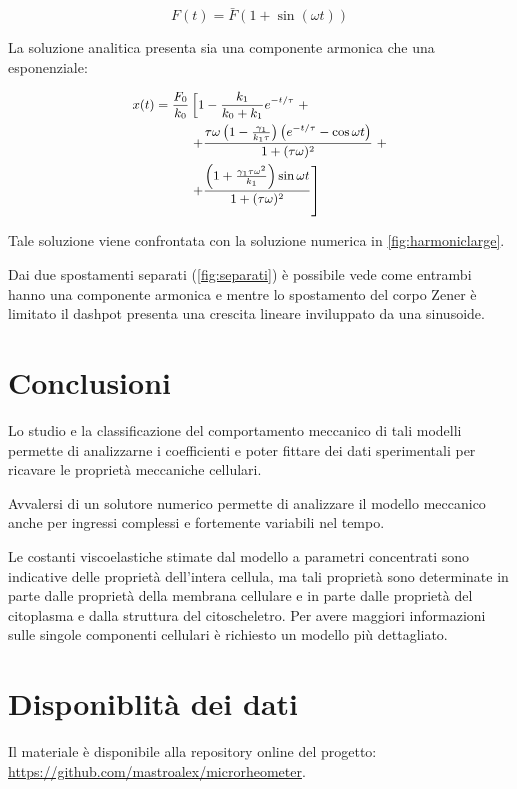 \begin{equation}
	F(t)=\bar F\left(1+\sin (\omega t)\right)
\end{equation}

La soluzione analitica presenta sia una componente armonica che una esponenziale:

\begin{equation}
	\small{\begin{aligned}
	x(t)=\frac{F_{0}}{k_{0}}& \left[ 1-\frac{k_{1}}{k_{0}+k_{1}} e^{-t / \tau}\right.+ \\
		&\left.+\frac{\tau \omega\left(1-\frac{\gamma_{1}}{k_{1} \tau}\right)\left(e^{-t / \tau}-\cos \omega t\right)}{1+(\tau \omega)^{2}}\right.+\\
		&\left.+\frac{\left(1+\frac{\gamma_{1} \tau \omega^{2}}{k_{1}}\right) \sin \omega t}{1+(\tau \omega)^{2}}\right]
	\end{aligned}}
	\end{equation}

Tale soluzione viene confrontata con la soluzione numerica in \cref{fig:harmoniclarge}. 

Dai due spostamenti separati (\cref{fig:separati}) è possibile vede come entrambi hanno una componente armonica e mentre lo spostamento del corpo Zener è limitato il dashpot presenta una crescita lineare inviluppato da una sinusoide.


\section{Conclusioni}

Lo studio e la classificazione del comportamento meccanico di tali modelli permette di analizzarne i coefficienti e poter fittare dei dati sperimentali per ricavare le proprietà meccaniche cellulari.

Avvalersi di un solutore numerico permette di analizzare il modello meccanico anche per ingressi complessi e fortemente variabili nel tempo. 

Le costanti viscoelastiche stimate dal modello a parametri concentrati sono indicative delle proprietà dell'intera cellula, ma tali proprietà sono determinate in parte dalle proprietà della membrana cellulare e in parte dalle proprietà del citoplasma e dalla struttura del citoscheletro. Per avere maggiori informazioni sulle singole componenti cellulari è richiesto un modello più dettagliato.

\raggedbottom


\section*{Disponiblità dei dati}

Il materiale è disponibile alla repository online del progetto: \url{https://github.com/mastroalex/microrheometer}.

\printbibliography[title=Riferimenti]



